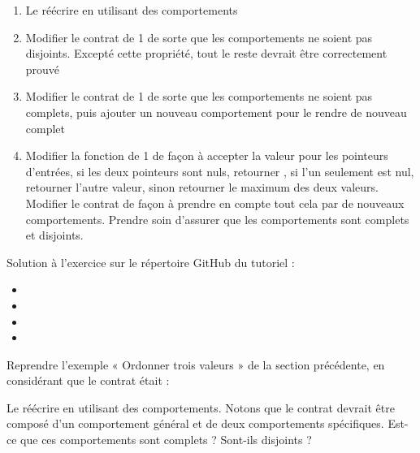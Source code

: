 

\begin{enumerate}
\item Le réécrire en utilisant des comportements
\item Modifier le contrat de 1 de sorte que les comportements ne
  soient pas disjoints. Excepté cette propriété, tout le reste devrait
  être correctement prouvé
\item Modifier le contrat de 1 de sorte que les comportements ne
  soient pas complets, puis ajouter un nouveau comportement pour le
  rendre de nouveau complet
\item Modifier la fonction de 1 de façon à accepter la valeur
   pour les pointeurs d'entrées, si les deux pointeurs
  sont nuls, retourner  , si l'un seulement est
  nul, retourner l'autre valeur, sinon retourner le maximum des deux
  valeurs. Modifier le contrat de façon à prendre en compte tout cela
  par de nouveaux comportements. Prendre soin d'assurer que les comportements
  sont complets et disjoints.
\end{enumerate}


\begin{Information}
  Solution à l'exercice sur le répertoire GitHub du tutoriel :
  \begin{itemize}
    \item {}
    \item {}
    \item {}
    \item {}
  \end{itemize}
\end{Information}





Reprendre l'exemple « Ordonner trois valeurs » de la section
précédente, en considérant que le contrat était :




Le réécrire en utilisant des comportements. Notons que le contrat
devrait être composé d'un comportement général et de deux
comportements spécifiques. Est-ce que ces comportements sont complets ?
Sont-ils disjoints ?


